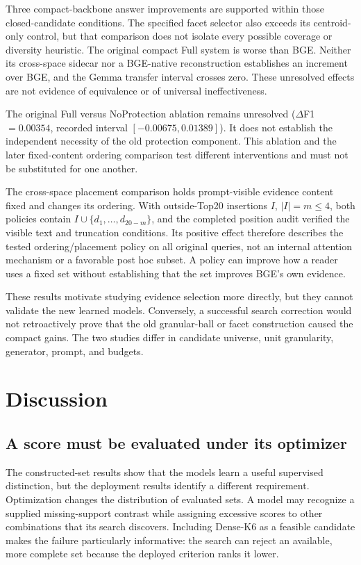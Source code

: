 \documentclass[pdflatex,sn-mathphys-num]{sn-jnl}
\begin{document}
Three compact-backbone answer improvements are supported within those
closed-candidate conditions. The specified facet selector also exceeds its
centroid-only control, but that comparison does not isolate every possible
coverage or diversity heuristic. The original compact Full system is worse
than BGE. Neither its cross-space sidecar nor a BGE-native reconstruction
establishes an increment over BGE, and the Gemma transfer interval crosses
zero. These unresolved effects are not evidence of equivalence or of
universal ineffectiveness.

The original Full versus NoProtection ablation remains unresolved
($\Delta$F1 $=0.00354$, recorded interval $[-0.00675,0.01389]$). It does not
establish the independent necessity of the old protection component. This
ablation and the later fixed-content ordering comparison test different
interventions and must not be substituted for one another.

The cross-space placement comparison holds prompt-visible evidence content
fixed and changes its ordering. With outside-Top20 insertions $I$, $|I|=m\leq4$,
both policies contain $I\cup\{d_1,\ldots,d_{20-m}\}$, and the completed
position audit verified the visible text and truncation conditions. Its
positive effect therefore describes the tested ordering/placement policy
on all original queries, not an internal attention mechanism or a favorable
post hoc subset. A policy can improve how a reader uses a fixed set without
establishing that the set improves BGE's own evidence.

These results motivate studying evidence selection more directly, but they
cannot validate the new learned models. Conversely, a successful search
correction would not retroactively prove that the old granular-ball or
facet construction caused the compact gains. The two studies differ in
candidate universe, unit granularity, generator, prompt, and budgets.

\section{Discussion}
\subsection{A score must be evaluated under its optimizer}
The constructed-set results show that the models learn a useful supervised
distinction, but the deployment results identify a different requirement.
Optimization changes the distribution of evaluated sets. A model may
recognize a supplied missing-support contrast while assigning excessive
scores to other combinations that its search discovers. Including Dense-K6
as a feasible candidate makes the failure particularly informative: the
search can reject an available, more complete set because the deployed
criterion ranks it lower.
\end{document}
